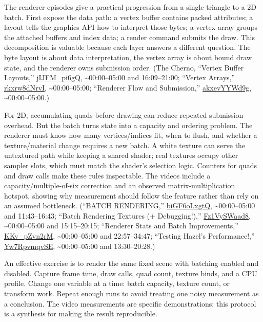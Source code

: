 The renderer episodes give a practical progression from a single triangle to a 2D batch. First expose the data path: a vertex buffer contains packed attributes; a layout tells the graphics API how to interpret those bytes; a vertex array groups the attached buffers and index data; a render command submits the draw. This decomposition is valuable because each layer answers a different question. The byte layout is about data interpretation, the vertex array is about bound draw state, and the renderer owns submission order. (The Cherno, ``Vertex Buffer Layouts,'' \href{https://www.youtube.com/watch?v=jIJFM_pi6gQ}{jIJFM\_pi6gQ}, \textasciitilde00:00--05:00 and 16:09--21:00; ``Vertex Arrays,'' \href{https://www.youtube.com/watch?v=rkxrw8dNrvI}{rkxrw8dNrvI}, \textasciitilde00:00--05:00; ``Renderer Flow and Submission,'' \href{https://www.youtube.com/watch?v=akxevYYWd9g}{akxevYYWd9g}, \textasciitilde00:00--05:00.)

For 2D, accumulating quads before drawing can reduce repeated submission overhead. But the batch turns state into a capacity and ordering problem. The renderer must know how many vertices/indices fit, when to flush, and whether a texture/material change requires a new batch. A white texture can serve the untextured path while keeping a shared shader; real textures occupy other sampler slots, which must match the shader's selection logic. Counters for quads and draw calls make these rules inspectable. The videos include a capacity/multiple-of-six correction and an observed matrix-multiplication hotspot, showing why measurement should follow the feature rather than rely on an assumed bottleneck. (``BATCH RENDERING,'' \href{https://www.youtube.com/watch?v=biGF6oLxgtQ}{biGF6oLxgtQ}, \textasciitilde00:00--05:00 and 11:43--16:43; ``Batch Rendering Textures (+ Debugging!),'' \href{https://www.youtube.com/watch?v=Fz1VySWaad8}{Fz1VySWaad8}, \textasciitilde00:00--05:00 and 15:15--20:15; ``Renderer Stats and Batch Improvements,'' \href{https://www.youtube.com/watch?v=KKv_pZvn2rM}{KKv\_pZvn2rM}, \textasciitilde00:00--05:00 and 22:57--34:47; ``Testing Hazel's Performance!,'' \href{https://www.youtube.com/watch?v=Yw7RpvmqvSE}{Yw7RpvmqvSE}, \textasciitilde00:00--05:00 and 13:30--20:28.)

An effective exercise is to render the same fixed scene with batching enabled and disabled. Capture frame time, draw calls, quad count, texture binds, and a CPU profile. Change one variable at a time: batch capacity, texture count, or transform work. Repeat enough runs to avoid treating one noisy measurement as a conclusion. The video measurements are specific demonstrations; this protocol is a synthesis for making the result reproducible.

